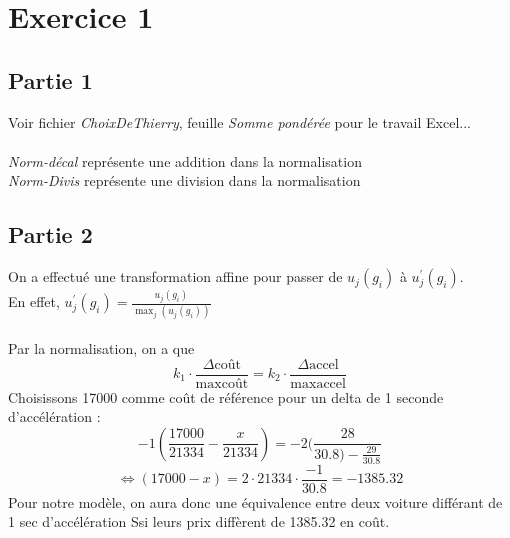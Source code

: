 \documentclass[a4paper, 12pt]{article}
\begin{document}
	\section*{Exercice 1}
		\subsection*{Partie 1}
			Voir fichier \textit{ChoixDeThierry}, feuille 
			\textit{Somme pondérée} pour le travail Excel...\\
			~\\
			\textit{Norm-décal} représente une addition dans la
			 normalisation\\
			\textit{Norm-Divis} représente une division dans la 
			 normalisation
		\subsection*{Partie 2}
			On a effectué une transformation affine pour passer de
			$u_j(g_i)$ à $u^{'}_{j}(g_i)$. \\
			En effet,  $u^{'}_{j}(g_i) = 
			\frac{u_j(g_i)}{\max_j (u_j(g_i))}$\\
			~\\
			Par la normalisation, on a que 
			$$ k_1 \cdot \frac{\Delta \text{coût}}{\max \text{coût}} 
			 = k_2 \cdot \frac{\Delta \text{accel}}{\max \text{accel}}$$
			Choisissons 17000 comme coût de référence pour un delta de 1
			seconde d'accélération : 
			$$ -1 (\frac{17000}{21334} - \frac{x}{21334})
			 = -2 (\frac{28}{30.8) - \frac{29}{30.8}} $$
			$$ \Leftrightarrow 
			   (17000 - x) = 2 \cdot 21334 \cdot \frac{-1}{30.8} 
			 = -1385.32 $$
			Pour notre modèle, on aura donc une équivalence entre deux
			voiture différant de 1 sec d'accélération Ssi leurs prix 
			diffèrent de 1385.32 en coût.
\end{document}

